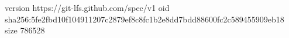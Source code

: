 version https://git-lfs.github.com/spec/v1
oid sha256:5fe2fbd10f104911207c2879ef8c8fc1b2e8dd7bdd88600fc2c589455909eb18
size 786528
